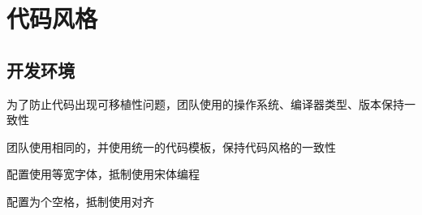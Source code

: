 \begin{savequote}[45mm]
\end{savequote}

\chapter{代码风格} 
\label{ch:physical-design}

\section{开发环境}

\begin{content}

\begin{regulation}
为了防止代码出现可移植性问题，团队使用的操作系统、编译器类型、版本保持一致性
\end{regulation}

\begin{regulation}
团队使用相同的，并使用统一的代码模板，保持代码风格的一致性
\end{regulation}

\begin{regulation}
配置使用等宽字体，抵制使用宋体编程
\end{regulation}

\begin{regulation}
配置为个空格，抵制使用对齐
\end{regulation}

\end{content}